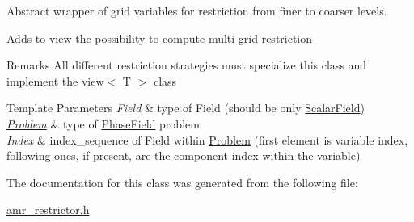 Abstract wrapper of grid variables for restriction from finer to coarser levels. 

Adds to view the possibility to compute multi-\/grid restriction

\begin{DoxyRemark}{Remarks}
All different restriction strategies must specialize this class and implement the view$<$ T $>$ class
\end{DoxyRemark}

\begin{DoxyTemplParams}{Template Parameters}
{\em Field} & type of Field (should be only \hyperlink{structUintah_1_1PhaseField_1_1ScalarField}{Scalar\+Field}) \\
\hline
{\em \hyperlink{classUintah_1_1PhaseField_1_1Problem}{Problem}} & type of \hyperlink{namespaceUintah_1_1PhaseField}{Phase\+Field} problem \\
\hline
{\em Index} & index\+\_\+sequence of Field within \hyperlink{classUintah_1_1PhaseField_1_1Problem}{Problem} (first element is variable index, following ones, if present, are the component index within the variable) \\
\hline
\end{DoxyTemplParams}


The documentation for this class was generated from the following file\+:\begin{DoxyCompactItemize}
\item 
\hyperlink{amr__restrictor_8h}{amr\+\_\+restrictor.\+h}\end{DoxyCompactItemize}
